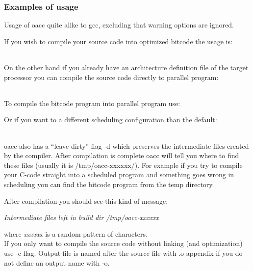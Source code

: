 \documentclass[a4paper,twoside]{tceusermanual}
\begin{document}
\subsubsection{Examples of usage}

Usage of oacc quite alike to gcc, excluding that warning options are
ignored.

If you wish to compile your source code into optimized bitcode the
usage is:

 \\

On the other hand if you already have an architecture definition file of the
target processor you can compile the source code directly to parallel program:

 \\

To compile the bitcode program into parallel program use:


Or if you want to a different scheduling configuration than the default:

 \\

oacc also has a ``leave dirty'' flag -d which preserves the intermediate
files created by the compiler. After compilation is complete oacc will tell
you where to find these files (usually it is /tmp/oacc-xxxxxx/). For example
if you try to compile your C-code straight into a scheduled program and
something goes wrong in scheduling you can find the bitcode program from the
temp directory.


After compilation you should see this kind of message:

\textit{Intermediate files left in build dir /tmp/oacc-xxxxxx}

where \textit{xxxxxx} is a random pattern of characters. \\

If you only want to compile the source code without linking
(and optimization) use -c flag. Output file is named after the source file
with .o appendix if you do not define an output name with -o.

\end{document}
